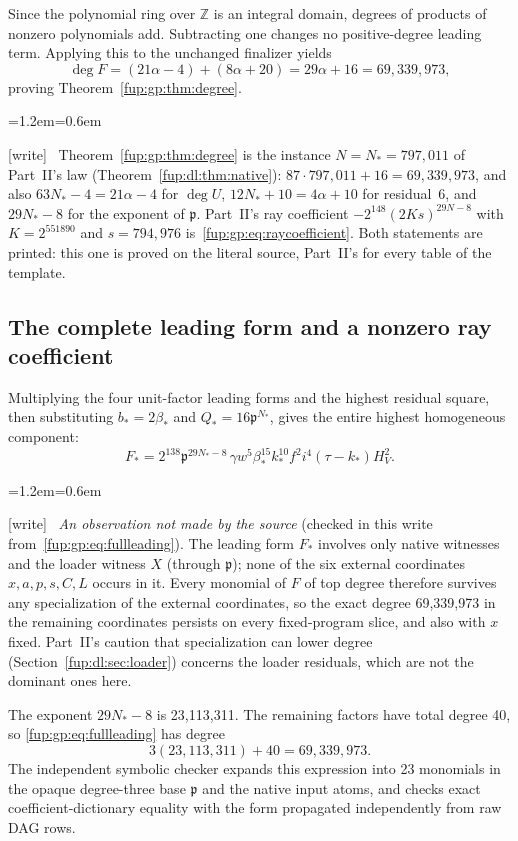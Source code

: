 \documentclass[11pt,letterpaper]{article}
\theoremstyle{definition}\newtheorem{definition}[theorem]{Definition}
\theoremstyle{remark}\newtheorem{remark}[theorem]{Remark}
\newcommand{\Z}{\mathbb Z}\newcommand{\Np}{\mathbb Z_{>0}}
\newcommand{\wtag}{\textup{[write]}}
\newenvironment{writenote}{\par\smallskip\begin{list}{}{\leftmargin=1.2em\rightmargin=0.6em}\item[]\small\wtag\ }{\end{list}\smallskip}
\begin{document}
Since the polynomial ring over $\Z$ is an integral domain, degrees of products of nonzero polynomials add. Subtracting one changes no positive-degree leading term. Applying this to the unchanged finalizer yields
\[
 \deg F=(21\alpha-4)+(8\alpha+20)=29\alpha+16=69,339,973,
\]
proving Theorem~\ref{fup:gp:thm:degree}.
\begin{writenote}
Theorem~\ref{fup:gp:thm:degree} is the instance $N=N_*=797{,}011$ of Part~II's law (Theorem~\ref{fup:dl:thm:native}): $87\cdot797{,}011+16=69{,}339{,}973$, and also $63N_*-4=21\alpha-4$ for $\deg U$, $12N_*+10=4\alpha+10$ for residual~6, and $29N_*-8$ for the exponent of $\mathfrak p$. Part~II's ray coefficient $-2^{148}(2Ks)^{29N-8}$ with $K=2^{551890}$ and $s=794{,}976$ is~\eqref{fup:gp:eq:raycoefficient}. Both statements are printed: this one is proved on the literal source, Part~II's for every table of the template.
\end{writenote}

\subsection{The complete leading form and a nonzero ray coefficient}
Multiplying the four unit-factor leading forms and the highest residual square, then substituting $b_*=2\beta_*$ and $Q_*=16\mathfrak p^{N_*}$, gives the entire highest homogeneous component:
\begin{equation}\label{fup:gp:eq:fullleading}
 F_*=2^{138}\mathfrak p^{29N_*-8}\,
 \gamma w^5\beta_*^{15}k_*^{10}f^2i^4(\tau-k_*)H_V^2.
\end{equation}
\begin{writenote}
\emph{An observation not made by the source} (checked in this write from~\eqref{fup:gp:eq:fullleading}). The leading form $F_*$ involves only native witnesses and the loader witness $X$ (through $\mathfrak p$); none of the six external coordinates $x,a,p,s,C,L$ occurs in it. Every monomial of $F$ of top degree therefore survives any specialization of the external coordinates, so the exact degree 69,339,973 in the remaining coordinates persists on every fixed-program slice, and also with $x$ fixed. Part~II's caution that specialization can lower degree (Section~\ref{fup:dl:sec:loader}) concerns the loader residuals, which are not the dominant ones here.
\end{writenote}
The exponent $29N_*-8$ is 23,113,311. The remaining factors have total degree 40, so \eqref{fup:gp:eq:fullleading} has degree
\[
 3(23,113,311)+40=69,339,973.
\]
The independent symbolic checker expands this expression into 23 monomials in the opaque degree-three base $\mathfrak p$ and the native input atoms, and checks exact coefficient-dictionary equality with the form propagated independently from raw DAG rows.
\end{document}
